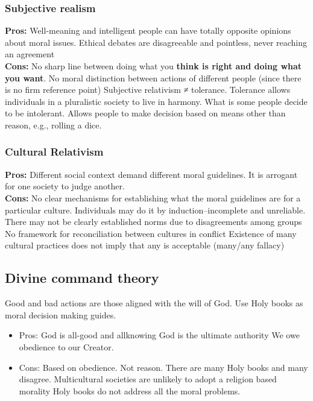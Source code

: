 \documentclass{article}
\begin{document}
\subsubsection{Subjective realism}
\begin{flushleft}
  \textbf{Pros:} Well-meaning and intelligent people can have totally opposite opinions about moral issues. Ethical debates are disagreeable and pointless, never reaching an agreement\\
  \textbf{Cons:} No sharp line between doing what you \textbf{think is right and doing what you want}. No moral distinction between actions of different people (since there is no firm reference point) Subjective relativism ≠ tolerance. Tolerance allows individuals in a pluralistic society to live in harmony. What is some people decide to be intolerant. Allows people to make decision based on means other than reason, e.g., rolling a dice.
\end{flushleft}

\subsubsection{Cultural Relativism}
\begin{flushleft}
  \textbf{Pros:} Different social context demand different moral guidelines. It is arrogant for one society to judge another.\\
  \textbf{Cons:} No clear mechanisms for establishing what the moral guidelines are for a particular culture. Individuals may do it by induction–incomplete and unreliable. There may not be clearly established norms due to disagreements among groups No framework for reconciliation between cultures in conflict Existence of many cultural practices does not imply that any is acceptable (many/any fallacy)
\end{flushleft}


\subsection{Divine command theory}
\begin{flushleft}
Good and bad actions are those aligned with the will of God. Use Holy books as moral decision making guides. 
\begin{itemize}
  \item Pros: God is all-good and allknowing God is the ultimate authority We owe obedience to our Creator.
  \item Cons: Based on obedience. Not reason. There are many Holy books and many disagree. Multicultural societies are unlikely to adopt a religion based morality Holy books do not address all the moral problems.
\end{itemize}
\end{flushleft}
\end{document}
